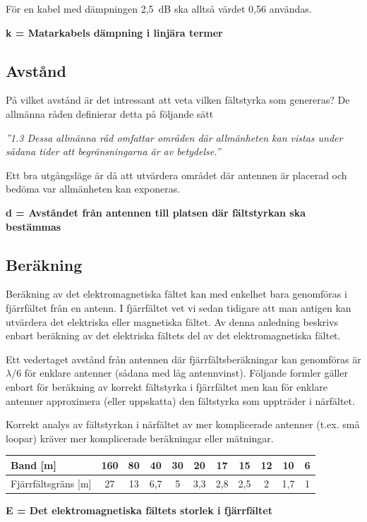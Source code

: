 För en kabel med dämpningen 2,5~dB ska alltså värdet 0,56 användas.

\textbf{k = Matarkabels dämpning i linjära termer}

\subsection{Avstånd}

På vilket avstånd är det intressant att veta vilken fältstyrka som genereras?
De allmänna råden definierar detta på följande sätt

\emph{''1.3 Dessa allmänna råd omfattar områden där allmänheten kan vistas
  under sådana tider att begränsningarna är av betydelse.''}

Ett bra utgångsläge är då att utvärdera området där antennen är placerad och
bedöma var allmänheten kan exponeras.

\textbf{d = Avståndet från antennen till platsen där fältstyrkan ska bestämmas}

\subsection{Beräkning}

Beräkning av det elektromagnetiska fältet kan med enkelhet bara
genomföras i fjärrfältet från en antenn.
I fjärrfältet vet vi sedan tidigare att man antigen kan utvärdera det
elektriska eller magnetiska fältet.
Av denna anledning beskrivs enbart beräkning av det elektriska fältets del av
det elektromagnetiska fältet.

Ett vedertaget avstånd från antennen där fjärrfältsberäkningar kan
genomföras är \(\lambda/6\) för enklare antenner (sådana med låg antennvinst).
Följande formler gäller enbart för beräkning av korrekt fältstyrka i
fjärrfältet men kan för enklare antenner approximera (eller uppskatta) den
fältstyrka som uppträder i närfältet.

Korrekt analys av fältstyrkan i närfältet av mer komplicerade antenner
(t.ex. små loopar) kräver mer komplicerade beräkningar eller mätningar.

\begin{tabular}{|l|c|c|c|c|c|c|c|c|c|c|}
\hline
Band [m] & 160 & 80 & 40 & 30 & 20 & 17 & 15 & 12 & 10 & 6 \\ \hline
Fjärrfältsgräns [m] & 27 & 13 & 6,7 & 5 & 3,3 & 2,8 & 2,5 & 2 & 1,7 & 1 \\ \hline
\end{tabular}

\textbf{E = Det elektromagnetiska fältets storlek i fjärrfältet}

